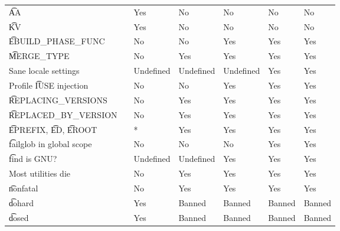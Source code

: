\begin{landscape}
\begin{longtable}{llP{7.5em}P{7.5em}P{7.5em}P{7.5em}P{7.5em}}
\t{AA} &  &
    Yes & No & No & No & No \\

\t{KV} &  &
    Yes & No & No & No & No \\

\t{EBUILD_PHASE_FUNC} &  &
    No & No & Yes & Yes & Yes \\

\t{MERGE_TYPE} &  &
    No & Yes & Yes & Yes & Yes \\

Sane locale settings &  &
    Undefined & Undefined & Undefined & Yes & Yes \\

Profile \t{IUSE} injection &  &
    No & No & Yes & Yes & Yes \\

\t{REPLACING_VERSIONS} &  &
    No & Yes & Yes & Yes & Yes \\

\t{REPLACED_BY_VERSION} &  &
    No & Yes & Yes & Yes & Yes \\

\t{EPREFIX}, \t{ED}, \t{EROOT} &  &
    * & Yes & Yes & Yes & Yes \\

\t{failglob} in global scope &  &
    No & No & No & Yes & Yes \\

\t{find} is GNU? &  &
    Undefined & Undefined & Yes & Yes & Yes \\

Most utilities die &  &
    No & Yes & Yes & Yes & Yes \\

\t{nonfatal} &  &
    No & Yes & Yes & Yes & Yes \\

\t{dohard} &  &
    Yes & Banned & Banned & Banned & Banned \\

\t{dosed} &  &
    Yes & Banned & Banned & Banned & Banned \\


\end{longtable}
\end{landscape}
